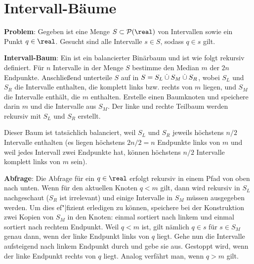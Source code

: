 \pagebreak

\section{%
    Intervall-Bäume%
}

\textbf{Problem}:
Gegeben ist eine Menge $S \subset \P(\real)$ von Intervallen sowie ein Punkt $q \in \real$.
Gesucht sind alle Intervalle $s \in S$, sodass $q \in s$ gilt.


\textbf{Intervall-Baum}:
Ein  ist ein balancierter Binärbaum und ist wie folgt rekursiv definiert.
Für $n$ Intervalle in der Menge $S$ bestimme den Median $m$ der $2n$ Endpunkte.
Anschließend unterteile $S$ auf in $S = S_L \mathbin{\dot{\cup}} S_M \mathbin{\dot{\cup}} S_R$,
wobei $S_L$ und $S_R$ die Intervalle enthalten, die komplett links bzw. rechts von $m$ liegen,
und $S_M$ die Intervalle enthält, die $m$ enthalten.
Erstelle einen Baumknoten und speichere darin $m$ und die Intervalle aus $S_M$.
Der linke und rechte Teilbaum werden rekursiv mit $S_L$ und $S_R$ erstellt.

Dieser Baum ist tatsächlich balanciert, weil $S_L$ und $S_R$ jeweils höchstens $n/2$
Intervalle enthalten
(es liegen höchstens $2n/2 = n$ Endpunkte links von $m$ und
weil jedes Intervall zwei Endpunkte hat,
können höchstens $n/2$ Intervalle komplett links von $m$ sein).

\linie

\textbf{Abfrage}:
Die Abfrage für ein $q \in \real$ erfolgt rekursiv in einem Pfad von oben nach unten.
Wenn für den aktuellen Knoten $q < m$ gilt, dann wird rekursiv in $S_L$ nachgeschaut
($S_R$ ist irrelevant) und einige Intervalle in $S_M$ müssen ausgegeben werden.
Um dies ef"|fizient erledigen zu können, speichere bei der Konstruktion
zwei Kopien von $S_M$ in den Knoten:
einmal sortiert nach linkem und einmal sortiert nach rechtem Endpunkt.
Weil $q < m$ ist, gilt nämlich $q \in s$ für $s \in S_M$ genau dann, wenn der linke Endpunkt
links von $q$ liegt.
Gehe nun die Intervalle aufsteigend nach linkem Endpunkt durch und gebe sie aus.
Gestoppt wird, wenn der linke Endpunkt rechts von $q$ liegt.
Analog verfährt man, wenn $q > m$ gilt.

